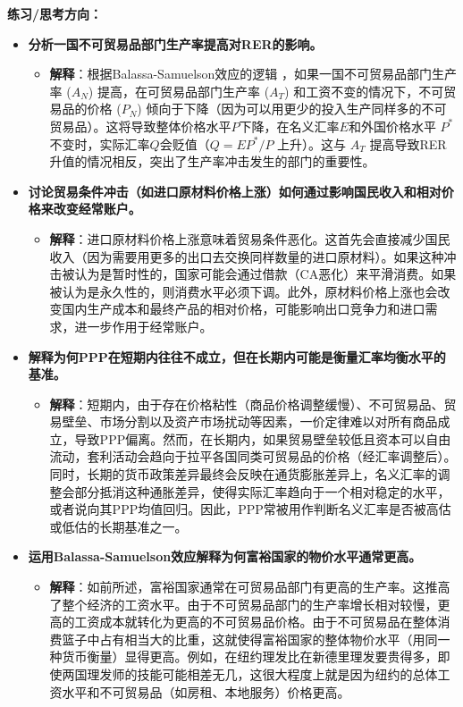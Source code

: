 \documentclass[12pt]{article}
\begin{document}
\textbf{练习/思考方向：}
\begin{itemize}
    \item \textbf{分析一国不可贸易品部门生产率提高对RER的影响。}
    \begin{itemize}
        \item \textbf{解释}：根据Balassa-Samuelson效应的逻辑 ，如果一国不可贸易品部门生产率 ($A_N$) 提高，在可贸易品部门生产率 ($A_T$) 和工资不变的情况下，不可贸易品的价格 ($P_N$) 倾向于下降（因为可以用更少的投入生产同样多的不可贸易品）。这将导致整体价格水平$P$下降，在名义汇率$E$和外国价格水平 $P^*$ 不变时，实际汇率$Q$会贬值（$Q=EP^*/P$ 上升）。这与 $A_T$ 提高导致RER升值的情况相反，突出了生产率冲击发生的部门的重要性。
    \end{itemize}
    \item \textbf{讨论贸易条件冲击（如进口原材料价格上涨）如何通过影响国民收入和相对价格来改变经常账户。}
    \begin{itemize}
        \item \textbf{解释}：进口原材料价格上涨意味着贸易条件恶化。这首先会直接减少国民收入（因为需要用更多的出口去交换同样数量的进口原材料）。如果这种冲击被认为是暂时性的，国家可能会通过借款（CA恶化）来平滑消费。如果被认为是永久性的，则消费水平必须下调。此外，原材料价格上涨也会改变国内生产成本和最终产品的相对价格，可能影响出口竞争力和进口需求，进一步作用于经常账户。
    \end{itemize}
    \item \textbf{解释为何PPP在短期内往往不成立，但在长期内可能是衡量汇率均衡水平的基准。}
    \begin{itemize}
        \item \textbf{解释}：短期内，由于存在价格粘性（商品价格调整缓慢）、不可贸易品、贸易壁垒、市场分割以及资产市场扰动等因素，一价定律难以对所有商品成立，导致PPP偏离。然而，在长期内，如果贸易壁垒较低且资本可以自由流动，套利活动会趋向于拉平各国同类可贸易品的价格（经汇率调整后）。同时，长期的货币政策差异最终会反映在通货膨胀差异上，名义汇率的调整会部分抵消这种通胀差异，使得实际汇率趋向于一个相对稳定的水平，或者说向其PPP均值回归。因此，PPP常被用作判断名义汇率是否被高估或低估的长期基准之一。
    \end{itemize}
    \item \textbf{运用Balassa-Samuelson效应解释为何富裕国家的物价水平通常更高。}
    \begin{itemize}
        \item \textbf{解释}：如前所述，富裕国家通常在可贸易品部门有更高的生产率。这推高了整个经济的工资水平。由于不可贸易品部门的生产率增长相对较慢，更高的工资成本就转化为更高的不可贸易品价格。由于不可贸易品在整体消费篮子中占有相当大的比重，这就使得富裕国家的整体物价水平（用同一种货币衡量）显得更高。例如，在纽约理发比在新德里理发要贵得多，即使两国理发师的技能可能相差无几，这很大程度上就是因为纽约的总体工资水平和不可贸易品（如房租、本地服务）价格更高。
    \end{itemize}
\end{itemize}
\end{document}
